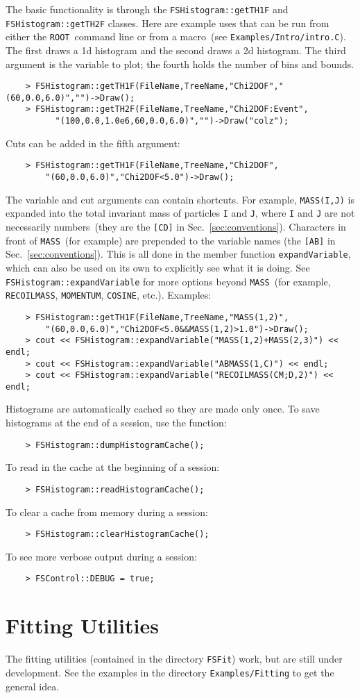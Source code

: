 \documentclass[11pt]{article}
\newcommand{\ROOT}{{\tt ROOT}}
\begin{document}
The basic functionality is through the {\tt FSHistogram::getTH1F} and {\tt FSHistogram::getTH2F} classes.  Here are example uses that can be run from either the \ROOT\ command line or from a macro~(see {\tt Examples/Intro/intro.C}).  The first draws a 1d histogram and the second draws a 2d histogram.  The third argument is the variable to plot; the fourth holds the number of bins and bounds.
\begin{verbatim}
    > FSHistogram::getTH1F(FileName,TreeName,"Chi2DOF","(60,0.0,6.0)","")->Draw();
    > FSHistogram::getTH2F(FileName,TreeName,"Chi2DOF:Event",
          "(100,0.0,1.0e6,60,0.0,6.0)","")->Draw("colz");
\end{verbatim}
Cuts can be added in the fifth argument:
\begin{verbatim}
    > FSHistogram::getTH1F(FileName,TreeName,"Chi2DOF",
        "(60,0.0,6.0)","Chi2DOF<5.0")->Draw();
\end{verbatim}
The variable and cut arguments can contain shortcuts.  For example, {\tt MASS(I,J)} is expanded into the total invariant mass of particles {\tt I} and {\tt J}, where {\tt I} and {\tt J} are not necessarily numbers~(they are the {\tt [CD]} in Sec.~\ref{sec:conventions}).  Characters in front of {\tt MASS}~(for example) are prepended to the variable names (the {\tt [AB]} in Sec.~\ref{sec:conventions}).  This is all done in the member function {\tt expandVariable}, which can also be used on its own to explicitly see what it is doing.    See {\tt FSHistogram::expandVariable} for more options beyond {\tt MASS}~(for example, {\tt RECOILMASS}, {\tt MOMENTUM}, {\tt COSINE}, etc.).  Examples:
\begin{verbatim}
    > FSHistogram::getTH1F(FileName,TreeName,"MASS(1,2)",
        "(60,0.0,6.0)","Chi2DOF<5.0&&MASS(1,2)>1.0")->Draw();
    > cout << FSHistogram::expandVariable("MASS(1,2)+MASS(2,3)") << endl;
    > cout << FSHistogram::expandVariable("ABMASS(1,C)") << endl;
    > cout << FSHistogram::expandVariable("RECOILMASS(CM;D,2)") << endl;
\end{verbatim}
Histograms are automatically cached so they are made only once.  To save histograms at the end of a session, use the function:
\begin{verbatim}
    > FSHistogram::dumpHistogramCache(); 
\end{verbatim}
To read in the cache at the beginning of a session:
\begin{verbatim}
    > FSHistogram::readHistogramCache(); 
\end{verbatim}
To clear a cache from memory during a session:
\begin{verbatim}
    > FSHistogram::clearHistogramCache(); 
\end{verbatim}
To see more verbose output during a session:
\begin{verbatim}
    > FSControl::DEBUG = true;
\end{verbatim}


\section{Fitting Utilities}

The fitting utilities (contained in the directory {\tt FSFit}) work, but are still under development.  See the examples in the directory {\tt Examples/Fitting} to get the general idea.
\end{document}
